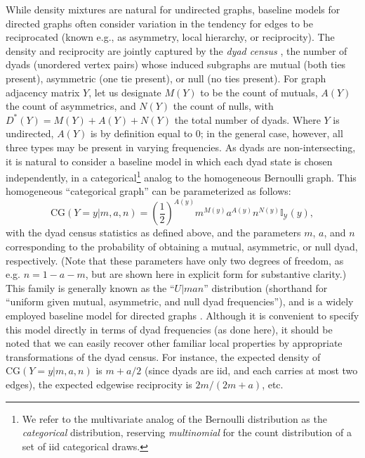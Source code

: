 \documentclass[11pt]{article}
\newcommand{\CG}{\ensuremath{\mathrm{CG}}\xspace}
\begin{document}
While density mixtures are natural for undirected graphs, baseline models for directed graphs often consider variation in the tendency for edges to be reciprocated (known e.g., as asymmetry, local hierarchy, or reciprocity).  The density and reciprocity are jointly captured by the \emph{dyad census} \citep{wasserman.faust:bk:1994}, the number of dyads (unordered vertex pairs) whose induced subgraphs are mutual (both ties present), asymmetric (one tie present), or null (no ties present).  For graph adjacency matrix $Y$, let us designate $M(Y)$ to be the count of mutuals, $A(Y)$ the count of asymmetrics, and $N(Y)$ the count of nulls, with $D^*(Y)=M(Y)+A(Y)+N(Y)$ the total number of dyads.  Where $Y$ is undirected, $A(Y)$ is by definition equal to 0; in the general case, however, all three types may be present in varying frequencies.  As dyads are non-intersecting, it is natural to consider a baseline model in which each dyad state is chosen independently, in a categorical\footnote{We refer to the multivariate analog of the Bernoulli distribution as the \emph{categorical} distribution, reserving \emph{multinomial} for the count distribution of a set of iid categorical draws.} analog to the homogeneous Bernoulli graph.  This homogeneous ``categorical graph'' can be parameterized as follows: 
\begin{equation*}
\CG(Y=y|m,a,n) = \left(\frac{1}{2}\right)^{A(y)} m^{M(y)} a^{A(y)} n^{N(y)} \mathbb{I}_\mathcal{Y}(y),
\end{equation*}
with the dyad census statistics as defined above, and the parameters $m$, $a$, and $n$ corresponding to the probability of obtaining a mutual, asymmetric, or null dyad, respectively.  (Note that these parameters have only two degrees of freedom, as e.g. $n=1-a-m$, but are shown here in explicit form for substantive clarity.)  This family is generally known as the ``$U|man$'' distribution (shorthand for ``uniform given mutual, asymmetric, and null dyad frequencies''), and is a widely employed baseline model for directed graphs \citep[see, e.g.][]{wasserman.faust:bk:1994}.  Although it is convenient to specify this model directly in terms of dyad frequencies (as done here), it should be noted that we can easily recover other familiar local properties by appropriate transformations of the dyad census.  For instance, the expected density of $\CG(Y=y|m,a,n)$ is $m+a/2$ (since dyads are iid, and each carries at most two edges), the expected edgewise reciprocity is $2m/(2m+a)$, etc.
\end{document}
